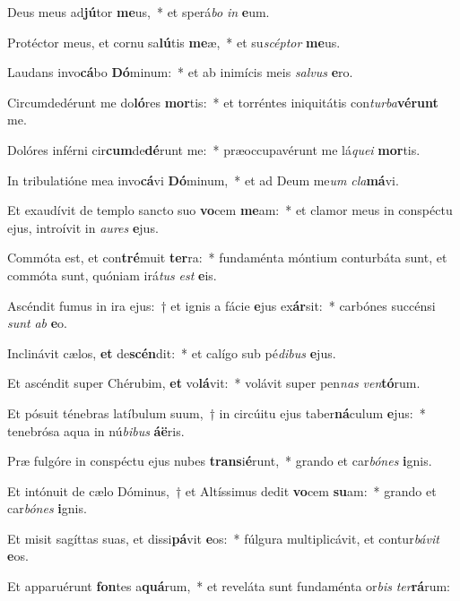 \item Deus meus ad\textbf{jú}tor \textbf{me}us,~* et sperá\textit{bo} \textit{in} \textbf{e}um.
\item Protéctor meus, et cornu sa\textbf{lú}tis \textbf{me}æ,~* et su\textit{scép}\textit{tor} \textbf{me}us.
\item Laudans invo\textbf{cá}bo \textbf{Dó}minum:~* et ab inimícis meis \textit{sal}\textit{vus} \textbf{e}ro.
\item Circumdedérunt me do\textbf{ló}res \textbf{mor}tis:~* et torréntes iniquitátis con\textit{tur}\textit{ba}\textbf{vé}\textbf{runt} me.
\item Dolóres inférni cir\textbf{cum}de\textbf{dé}runt me:~* præoccupavérunt me lá\textit{que}\textit{i} \textbf{mor}tis.
\item In tribulatióne mea invo\textbf{cá}vi \textbf{Dó}minum,~* et ad Deum me\textit{um} \textit{cla}\textbf{má}vi.
\item Et exaudívit de templo sancto suo \textbf{vo}cem \textbf{me}am:~* et clamor meus in conspéctu ejus, introívit in \textit{au}\textit{res} \textbf{e}jus.
\item Commóta est, et con\textbf{tré}muit \textbf{ter}ra:~* fundaménta móntium conturbáta sunt, et commóta sunt, quóniam irá\textit{tus} \textit{est} \textbf{e}is.
\item Ascéndit fumus in ira ejus:~† et ignis a fácie \textbf{e}jus ex\textbf{ár}sit:~* carbónes succénsi \textit{sunt} \textit{ab} \textbf{e}o.
\item Inclinávit cælos, \textbf{et} de\textbf{scén}dit:~* et calígo sub pé\textit{di}\textit{bus} \textbf{e}jus.
\item Et ascéndit super Chérubim, \textbf{et} vo\textbf{lá}vit:~* volávit super pen\textit{nas} \textit{ven}\textbf{tó}rum.
\item Et pósuit ténebras latíbulum suum,~† in circúitu ejus taber\textbf{ná}culum \textbf{e}jus:~* tenebrósa aqua in nú\textit{bi}\textit{bus} \textbf{á}\textbf{ë}ris.
\item Præ fulgóre in conspéctu ejus nubes \textbf{trans}i\textbf{é}runt,~* grando et car\textit{bó}\textit{nes} \textbf{i}gnis.
\item Et intónuit de cælo Dóminus,~† et Altíssimus dedit \textbf{vo}cem \textbf{su}am:~* grando et car\textit{bó}\textit{nes} \textbf{i}gnis.
\item Et misit sagíttas suas, et dissi\textbf{pá}vit \textbf{e}os:~* fúlgura multiplicávit, et contur\textit{bá}\textit{vit} \textbf{e}os.
\item Et apparuérunt \textbf{fon}tes a\textbf{quá}rum,~* et reveláta sunt fundaménta or\textit{bis} \textit{ter}\textbf{rá}rum:
